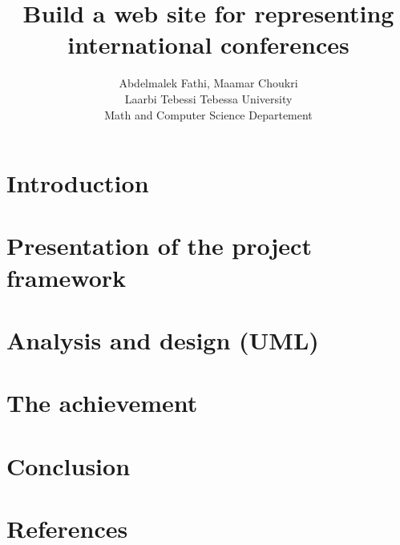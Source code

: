 \documentclass{article}
\author{Abdelmalek Fathi, Maamar Choukri\\
Laarbi Tebessi Tebessa University\\
Math and Computer Science Departement}
\title{Build a web site for representing international conferences}
\date{}
\begin{document}
	\maketitle
	\clearpage
	\tableofcontents
	\clearpage
	\section{Introduction}
	
	\clearpage
	\section{Presentation of the project framework}
	
	\clearpage
	\section{Analysis and design (UML)}
	
	\clearpage
	\section{The achievement}
	
	\clearpage
	\section{Conclusion}
	
	\clearpage
	\section{References}
	
\end{document}
